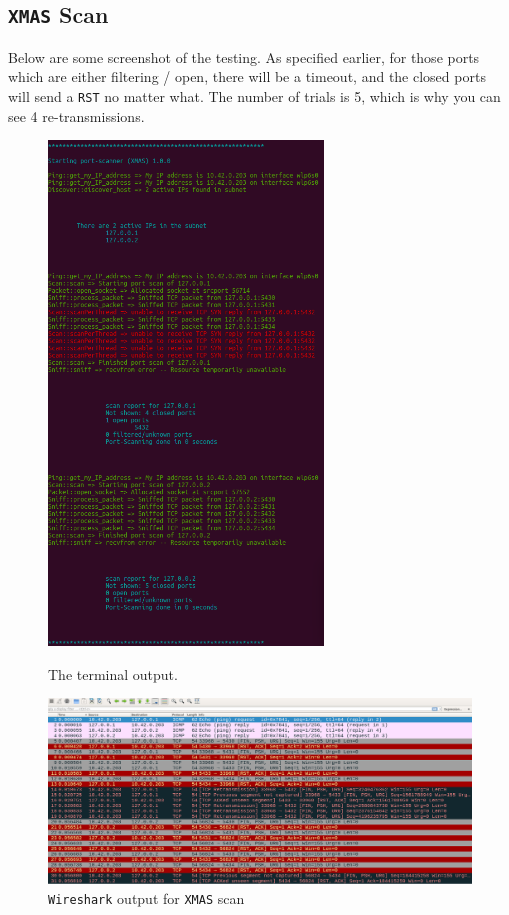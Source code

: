 \documentclass[12pt]{article}
\begin{document}
\subsection{\texttt{XMAS} Scan}
Below are some screenshot of the testing. As specified earlier, for those ports which are either filtering / open, there will be a timeout, and the closed ports will send a \texttt{RST} no matter what. The number of trials is 5, which is why you can see 4 re-transmissions.

\begin{figure}[H]
\begin{minipage}{0.48\linewidth}
\centering
\includegraphics[width=0.65\textwidth]{xmas-output.png}
\caption{The terminal output.}
\end{minipage}
\hfill
\begin{minipage}{0.48\linewidth}
\centering
\includegraphics[width=\textwidth]{wireshark-xmas.png}
\caption{\texttt{Wireshark} output for \texttt{XMAS} scan}
\end{minipage}
\end{figure}
\end{document}
